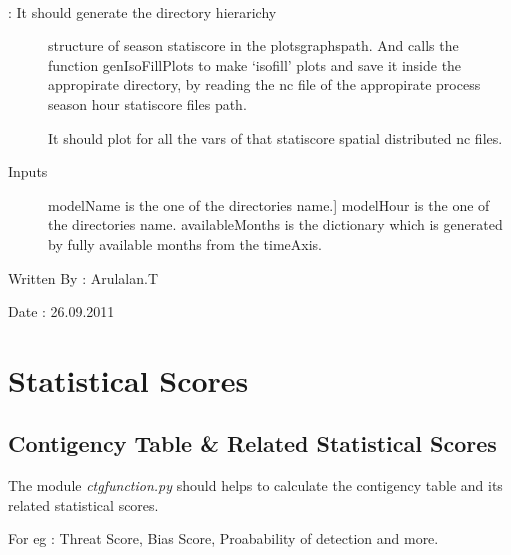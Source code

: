 \documentclass[letterpaper,10pt,english]{sphinxmanual}
\begin{document}
\begin{fulllineitems}
\label{diagnosis:generate_stati_score_spatial_distribution_plots.genSeasonStatiScoreDirs}~\begin{description}
\item[{{\hyperref[diagnosis:generate_stati_score_spatial_distribution_plots.genSeasonStatiScoreDirs]{}}: It should generate the directory hierarichy}] \leavevmode
structure of season statiscore in the plotsgraphspath. And calls the
function genIsoFillPlots to make `isofill' plots and save it
inside the appropirate directory, by reading the nc file of the
appropirate process season hour statiscore files path.

It should plot for all the vars of that statiscore spatial distributed
nc files.

\item[{Inputs}] \leavevmode{[}modelName is the one of the directories name.{]}
modelHour is the one of the directories name.
availableMonths is the dictionary which is generated by fully
available months from the timeAxis.

\end{description}

Written By : Arulalan.T

Date : 26.09.2011

\end{fulllineitems}



\section{Statistical Scores}
\label{diagnosis:statistical-scores}

\subsection{Contigency Table \& Related Statistical Scores}
\label{diagnosis:contigency-table-related-statistical-scores}
The module \emph{ctgfunction.py} should helps to calculate the contigency table and its related statistical scores.

For eg : Threat Score, Bias Score, Proabability of detection and more.
\label{diagnosis:module-ctgfunction}
\end{document}
